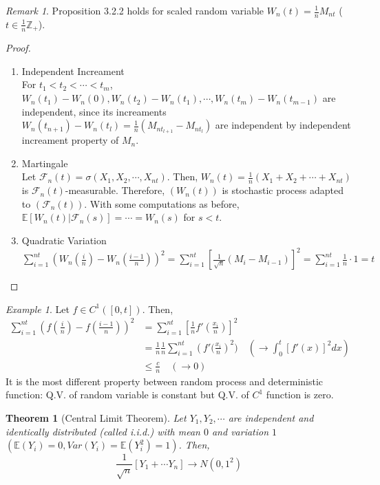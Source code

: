 \documentclass[12pt]{report}
\newcommand{\F}{\mathcal{F}}
\newcommand{\E}{\mathbb{E}}
\renewcommand{\1}{\mathbb{1}}
\theoremstyle{break}
\newtheorem{thm}{Theorem}[section] %
\theoremstyle{newdef}
\theoremstyle{remark}
\newtheorem*{exmp}{Example} %
\newtheorem*{rem}{Remark} %
\begin{document}
\begin{rem}
Proposition 3.2.2 holds for scaled random variable $W_n(t) = \frac{1}{n} M_{nt}$ ($t \in \frac{1}{n} \mathbb{Z}_+$).
\begin{proof}
\leavevmode
\begin{enumerate}
\item Independent Increament\\
For $t_1 < t_2 < \cdots < t_m$,
$W_n(t_1) - W_n(0), W_n(t_2) - W_n(t_1), \cdots, W_n(t_m) - W_n(t_{m-1})$ are independent,
since its increaments $W_n(t_{n+1}) - W_n(t_l) = \frac{1}{n} (M_{nt_{l+1}} - M_{nt_l})$ are independent by independent increament property of $M_n$.

\item Martingale\\
Let $\F_n(t) = \sigma(X_1, X_2, \cdots, X_{nt})$.
Then, $W_n(t) = \frac{1}{n} (X_1+X_2+\cdots+X_{nt})$ is $\F_n(t)$-measurable.
Therefore, $(W_n(t))$ is stochastic process adapted to $(\F_n(t))$.
With some computations as before, $\E[W_n(t) | \F_n(s)] = \cdots = W_n(s)$ for $s < t$.

\item Quadratic Variation\\
$\sum_{i=1}^{nt} \left(W_n(\frac{i}{n}) - W_n(\frac{i-1}{n})\right)^2
= \sum_{i=1}^{nt} \left[ \frac{1}{\sqrt n} (M_i - M_{i-1})\right]^2
= \sum_{i=1}^{nt} \frac{1}{n} \cdot 1
= t$
\end{enumerate}
\end{proof}
\end{rem}



\begin{exmp}
Let $f \in C^1([0,t])$.
Then,
$$
\begin{aligned}
\sum_{i=1}^{nt} \left( f(\frac{i}{n}) - f(\frac{i-1}{n}) \right)^2
&= \sum_{i=1}^{nt} \left[ \frac{1}{n} f'(\frac{x_i}{n})\right]^2\\
&= \frac{1}{n} \frac{1}{n} \sum_{i=1}^{nt} \left( f'(\frac{x_i}{n}\right)^2) \quad ( \rightarrow \int_0^t [f'(x)]^2dx)\\
&\leq \frac{c}{n} \quad (\rightarrow 0)
\end{aligned}
$$
It is the most different property between random process and deterministic function:
Q.V. of random variable is constant but Q.V. of $C^1$ function is zero.
\end{exmp}


\begin{thm}[Central Limit Theorem]
Let $Y_1, Y_2, \cdots$ are independent and identically distributed (called i.i.d.) with mean $0$ and variation $1$
$(\E(Y_i) = 0, Var(Y_i) = \E(Y_i^2) = 1)$.
Then, 
\begin{equation}
\frac{1}{\sqrt n}\left[Y_1 + \cdots Y_n \right] \rightarrow N(0,1^2)\tag{$\bigstar$}
\end{equation}
\end{thm}
\end{document}
